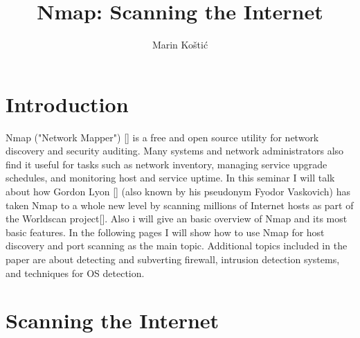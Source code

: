 \documentclass[times, utf8, seminar,english]{fer}
\begin{document}
\title{Nmap: Scanning the Internet}
\author{Marin Koštić}

\maketitle

\tableofcontents

\chapter{Introduction}
Nmap ("Network Mapper") [\cite{nmap}] is a free and open source utility for network discovery and security auditing. Many systems and network administrators also find it useful for tasks such as network inventory, managing service upgrade schedules, and monitoring host and service uptime. In this seminar I will talk about how Gordon Lyon [\cite{wiki:Gordon}] (also known by his pseudonym Fyodor Vaskovich) has taken Nmap to a whole new level by scanning millions of Internet hosts as part of the Worldscan project[\cite{Fyodor}]. Also i will give an basic overview of Nmap and its most basic features. In the following pages I will show how to use Nmap for host discovery and port scanning as the main topic. Additional topics included in the paper are about detecting and subverting firewall, intrusion detection systems, and techniques for OS detection.

\chapter{Scanning the Internet}
\end{document}
